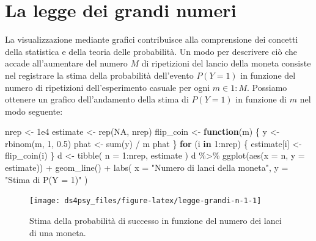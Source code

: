 \documentclass[
  11pt,
]{krantz}
\makeatletter
\newenvironment{Shaded}{\begin{snugshade}}{\end{snugshade}}
\newcommand{\AttributeTok}[1]{\textcolor[rgb]{0.61,0.61,0.61}{#1}}
\newcommand{\ConstantTok}[1]{\textcolor[rgb]{0,0,0}{#1}}
\newcommand{\ControlFlowTok}[1]{\textcolor[rgb]{0.27,0.27,0.27}{\textbf{#1}}}
\newcommand{\DecValTok}[1]{\textcolor[rgb]{0.06,0.06,0.06}{#1}}
\newcommand{\FloatTok}[1]{\textcolor[rgb]{0.06,0.06,0.06}{#1}}
\newcommand{\FunctionTok}[1]{\textcolor[rgb]{0,0,0}{#1}}
\newcommand{\NormalTok}[1]{#1}
\newcommand{\OtherTok}[1]{\textcolor[rgb]{0.37,0.37,0.37}{#1}}
\newcommand{\SpecialCharTok}[1]{\textcolor[rgb]{0,0,0}{#1}}
\newcommand{\StringTok}[1]{\textcolor[rgb]{0.5,0.5,0.5}{#1}}
\newenvironment{kframe}{%
\medskip{}
\setlength{\fboxsep}{.8em}
 \def\at@end@of@kframe{}%
 \ifinner\ifhmode%
  \def\at@end@of@kframe{\end{minipage}}%
  \begin{minipage}{\columnwidth}%
 \fi\fi%
 \def\FrameCommand##1{\hskip\@totalleftmargin \hskip-\fboxsep
 \colorbox{shadecolor}{##1}\hskip-\fboxsep
     \hskip-\linewidth \hskip-\@totalleftmargin \hskip\columnwidth}%
 \MakeFramed {\advance\hsize-\width
   \@totalleftmargin\z@ \linewidth\hsize
   \@setminipage}}%
 {\par\unskip\endMakeFramed%
 \at@end@of@kframe}
\renewenvironment{Shaded}{\begin{kframe}}{\end{kframe}}
\theoremstyle{definition}
\theoremstyle{definition}
\theoremstyle{definition}
\theoremstyle{definition}
\theoremstyle{remark}
\makeatother
\begin{document}
\hypertarget{la-legge-dei-grandi-numeri}{%
\section{La legge dei grandi numeri}\label{la-legge-dei-grandi-numeri}}

La visualizzazione mediante grafici contribuisce alla comprensione dei concetti della statistica e della teoria delle probabilità. Un modo per descrivere ciò che accade all'aumentare del numero \(M\) di ripetizioni del lancio della moneta consiste nel registrare la stima della probabilità dell'evento \(P(Y = 1)\) in funzione del numero di ripetizioni dell'esperimento casuale per ogni \(m \in 1:M\). Possiamo ottenere un grafico dell'andamento della stima di \(P(Y = 1)\) in funzione di \(m\) nel modo seguente:

\begin{Shaded}
\begin{Highlighting}[]
\NormalTok{nrep }\OtherTok{\textless{}{-}} \FloatTok{1e4}
\NormalTok{estimate }\OtherTok{\textless{}{-}} \FunctionTok{rep}\NormalTok{(}\ConstantTok{NA}\NormalTok{, nrep)}
\NormalTok{flip\_coin }\OtherTok{\textless{}{-}} \ControlFlowTok{function}\NormalTok{(m) \{}
\NormalTok{  y }\OtherTok{\textless{}{-}} \FunctionTok{rbinom}\NormalTok{(m, }\DecValTok{1}\NormalTok{, }\FloatTok{0.5}\NormalTok{)}
\NormalTok{  phat }\OtherTok{\textless{}{-}} \FunctionTok{sum}\NormalTok{(y) }\SpecialCharTok{/}\NormalTok{ m}
\NormalTok{  phat}
\NormalTok{\}}
\ControlFlowTok{for}\NormalTok{ (i }\ControlFlowTok{in} \DecValTok{1}\SpecialCharTok{:}\NormalTok{nrep) \{}
\NormalTok{  estimate[i] }\OtherTok{\textless{}{-}} \FunctionTok{flip\_coin}\NormalTok{(i)}
\NormalTok{\}}
\NormalTok{d }\OtherTok{\textless{}{-}} \FunctionTok{tibble}\NormalTok{(}
  \AttributeTok{n =} \DecValTok{1}\SpecialCharTok{:}\NormalTok{nrep,}
\NormalTok{  estimate}
\NormalTok{)}
\NormalTok{d }\SpecialCharTok{\%\textgreater{}\%}
  \FunctionTok{ggplot}\NormalTok{(}\FunctionTok{aes}\NormalTok{(}\AttributeTok{x =}\NormalTok{ n, }\AttributeTok{y =}\NormalTok{ estimate)) }\SpecialCharTok{+}
  \FunctionTok{geom\_line}\NormalTok{() }\SpecialCharTok{+}
  \FunctionTok{labs}\NormalTok{(}
    \AttributeTok{x =} \StringTok{"Numero di lanci della moneta"}\NormalTok{,}
    \AttributeTok{y =} \StringTok{"Stima di P(Y = 1)"}
\NormalTok{  )}
\end{Highlighting}
\end{Shaded}

\begin{figure}

{\centering \texttt{[image: ds4psy\_files/figure-latex/legge-grandi-n-1-1]} 

}

\caption{Stima della probabilità di successo in funzione del numero dei lanci di una moneta.}\label{fig:legge-grandi-n-1}
\end{figure}
\end{document}
